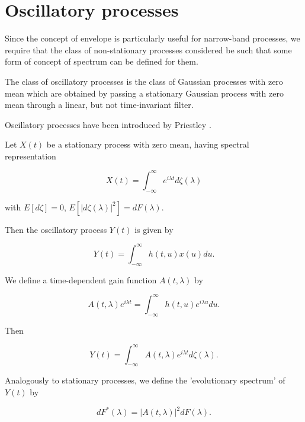 \documentclass{article}
\begin{document}
\section{Oscillatory processes}
Since the concept of envelope is particularly useful for narrow-band processes, we require that the class of non-stationary processes considered be such that some form of concept of spectrum can be defined for them.

The class of oscillatory processes is the class of Gaussian processes with zero mean which are obtained by passing a stationary Gaussian process with zero mean through a linear, but not time-invariant filter.

Oscillatory processes have been introduced by Priestley \cite{priestley1965}.

Let $X(t)$ be a stationary process with zero mean, having spectral representation

\begin{equation}
\label{eq:spectral_representation}
X(t) = \int_{-\infty}^{\infty} e^{i\lambda t} d\zeta(\lambda)
\end{equation}

with $E[d\zeta] = 0$, $E[|d\zeta(\lambda)|^2] = dF(\lambda)$.

Then the oscillatory process $Y(t)$ is given by

\begin{equation}
\label{eq:oscillatory_process}
Y(t) = \int_{-\infty}^{\infty} h(t, u)x(u) du.
\end{equation}

We define a time-dependent gain function $A(t, \lambda)$ by

\begin{equation}
\label{eq:gain_function}
A(t, \lambda)e^{i\lambda t} = \int_{-\infty}^{\infty} h(t, u)e^{i\lambda u} du.
\end{equation}

Then

\begin{equation}
\label{eq:oscillatory_representation}
Y(t) = \int_{-\infty}^{\infty} A(t, \lambda)e^{i\lambda t} d\zeta(\lambda).
\end{equation}

Analogously to stationary processes, we define the 'evolutionary spectrum' of $Y(t)$ by

\begin{equation}
\label{eq:evolutionary_spectrum}
dF^*(\lambda) = |A(t, \lambda)|^2 dF(\lambda).
\end{equation}
\end{document}
